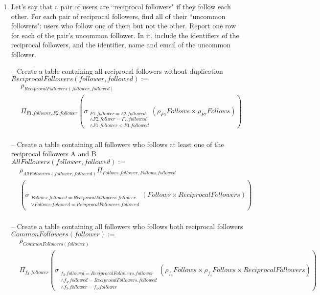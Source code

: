 \documentclass{article}
\newcommand{\var}[1]{\mathit{#1}}
\begin{document}
\begin{enumerate}
\item   %
Let's say that a pair of users are ``reciprocal followers" if they follow each other. 
For each pair of reciprocal followers, 
find all of their ``uncommon followers": 
users who follow one of them but not the other. 
Report one row for each of the pair's uncommon follower.
In it, include
the identifiers of the reciprocal followers,
and the identifier, name and email of the uncommon follower. 

{\large


-- Create a table containing all reciprocal followers without duplication \\
$\var{ReciprocalFollowers}(follower,followed) :=$
\begin{align*}
    &\rho_{\var{ReciprocalFollowers}(follower,followed)}\\
	&\Pi_{F1.follower, F2.follower} 
	\left(
		\sigma_{
			\substack{
				F1.follower = F2.followed\\
				\land F2.follwer = F1.followed\\
				\land F1.follower < F1.followed
			} 
		}
		(\rho_{F1} \var{Follows} \times \rho_{F2} \var{Follows})
	\right)\\
\end{align*}


-- Create a table containing all followers who follows at least one of the reciprocal followers A and B \\
$\var{AllFollowers}(follower,followed) :=$
\begin{align*}
    &\rho_{\var{AllFollowers}(follower,followed)} \Pi_{Follows.follower,Follows.followed}\\
	&
	\left(
		\sigma_{
			\substack{
				Follows.followed = ReciprocalFollowers.follower\\
				\lor Follows.followed = ReciprocalFollowers.followed \\
			}
		}
		(\var{Follows} \times \var{ReciprocalFollowers})
	\right)\\ 
\end{align*}


-- Create a table containing all followers who follows both reciprocal followers \\
$\var{CommonFollowers}(follower):=$
\begin{align*}
    &\rho_{\var{CommonFollowers}(follower)}\\
	&\Pi_{f_3.follower}
	\left(
		\sigma_{
			\substack{
				f_3.followed = ReciprocalFollowers.follower \\
				\land f_4.followed = ReciprocalFollowers.followed \\
				\land f_3.follower = f_4.follower
			}
		}
		(\rho_{f_3} \var{Follows} \times \rho_{f_4} \var{Follows} \times \var{ReciprocalFollowers})
	\right) \\
\end{align*}


}
\end{enumerate}
\end{document}
